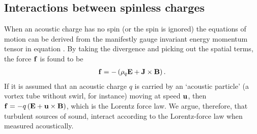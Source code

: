 




\subsection{Interactions between spinless charges}\label{sec:spinless}
When an acoustic charge has no spin (or the spin is ignored)
the equations of motion can be derived from the manifestly gauge invariant energy momentum tensor in  equation .
By taking the  divergence and picking out the spatial terms,
the force $\mathbf{f}$ is found to be \cite{Doran2003}
\begin{align}
  \mathbf{f} = - \left( \rho_q\mathbf{E} + \mathbf{J} \times \mathbf{B} \right).
\end{align}
If it is assumed that an acoustic charge $q$ is carried by an `acoustic particle' (a vortex tube without swirl, for instance)
moving at speed $\textbf{u}$, then
$\mathbf{f} = - q\left( \mathbf{E} + \textbf{u} \times \mathbf{B} \right)$, which is the Lorentz force law.
We argue, therefore, that turbulent sources of sound, interact according to the Lorentz-force law when measured acoustically.

